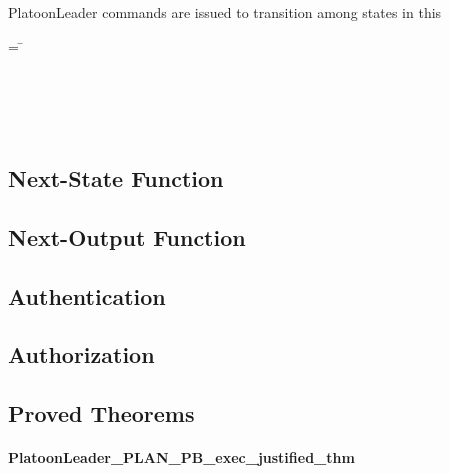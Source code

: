 \documentclass[../../main/main.tex]{subfiles}
\begin{document}
PlatoonLeader commands are issued to transition among states in this 

\begin{tabbing}
 = \= \\
						\>\HOLTokenBar{}  \\
						\>\HOLTokenBar{}  \\
						\>\HOLTokenBar{} \\
          					\>\HOLTokenBar{}  \\
						\>\HOLTokenBar{} 
\end{tabbing}

\subsection{Next-State Function}

\HOLssmPBIntegratedTheoremsPBNSXXdef


\subsection{Next-Output Function}

\HOLssmPBIntegratedTheoremsPBOutXXdef

\subsection{Authentication}

\HOLssmPBIntegratedTheoremsinputOKXXdef

\subsection{Authorization}

\HOLPBIntegratedDefTheoremssecContextXXdef

\subsection{Proved Theorems}

\paragraph*{PlatoonLeader_PLAN_PB_exec_justified_thm}
\HOLssmPBIntegratedTheoremsPlatoonLeaderXXPLANXXPBXXexecXXlemma
\end{document}
